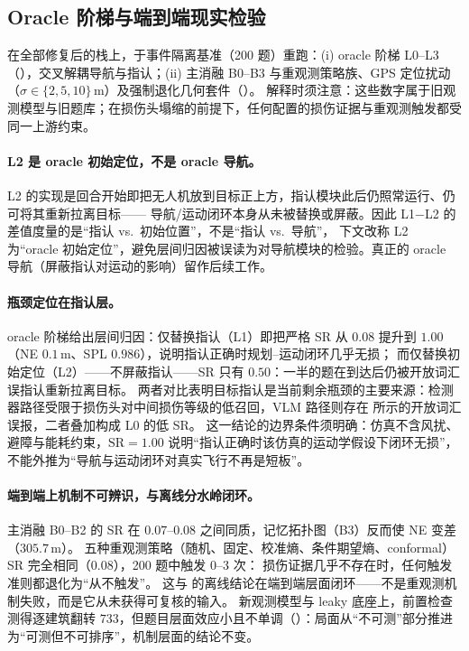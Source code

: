 \subsection{Oracle 阶梯与端到端现实检验}
\label{sec:x3x6}
在全部修复后的栈上，于事件隔离基准（200 题）重跑：(i) oracle 阶梯 L0--L3（），交叉解耦导航与指认；(ii) 主消融 B0--B3 与重观测策略族、GPS 定位扰动（$\sigma\in\{2,5,10\}\,\mathrm{m}$）及强制退化几何套件（）。
解释时须注意：这些数字属于旧观测模型与旧题库；在损伤头塌缩的前提下，任何配置的损伤证据与重观测触发都受同一上游约束。

\paragraph{L2 是 oracle 初始定位，不是 oracle 导航。}
L2 的实现是回合开始即把无人机放到目标正上方，指认模块此后仍照常运行、仍可将其重新拉离目标——
导航/运动闭环本身从未被替换或屏蔽。因此 L1$-$L2 的差值度量的是``指认 vs.\ 初始位置''，不是``指认 vs.\ 导航''，
下文改称 L2 为``oracle 初始定位''，避免层间归因被误读为对导航模块的检验。真正的 oracle 导航（屏蔽指认对运动的影响）留作后续工作。

\paragraph{瓶颈定位在指认层。}
oracle 阶梯给出层间归因：仅替换指认（L1）即把严格 SR 从 $0.08$ 提升到 $1.00$（NE $0.1\,\mathrm{m}$、SPL $0.986$），说明指认正确时规划--运动闭环几乎无损；
而仅替换初始定位（L2）——不屏蔽指认——SR 只有 $0.50$：一半的题在到达后仍被开放词汇误指认重新拉离目标。
两者对比表明目标指认是当前剩余瓶颈的主要来源：检测器路径受限于损伤头对中间损伤等级的低召回，VLM 路径则存在  所示的开放词汇误报，二者叠加构成 L0 的低 SR。
这一结论的边界条件须明确：仿真不含风扰、避障与能耗约束，$\mathrm{SR}=1.00$ 说明``指认正确时该仿真的运动学假设下闭环无损''，
不能外推为``导航与运动闭环对真实飞行不再是短板''。


\paragraph{端到端上机制不可辨识，与离线分水岭闭环。}
主消融 B0--B2 的 SR 在 $0.07$--$0.08$ 之间同质，记忆拓扑图（B3）反而使 NE 变差（$305.7\,\mathrm{m}$）。
五种重观测策略（随机、固定、校准熵、条件期望熵、conformal）SR 完全相同（$0.08$），200 题中触发 0--3 次：
损伤证据几乎不存在时，任何触发准则都退化为``从不触发''。
这与  的离线结论在端到端层面闭环——不是重观测机制失败，而是它从未获得可复核的输入。
新观测模型与 leaky 底座上，前置检查测得逐建筑翻转 $733$，但题目层面效应小且不单调（）：局面从``不可测''部分推进为``可测但不可排序''，机制层面的结论不变。

